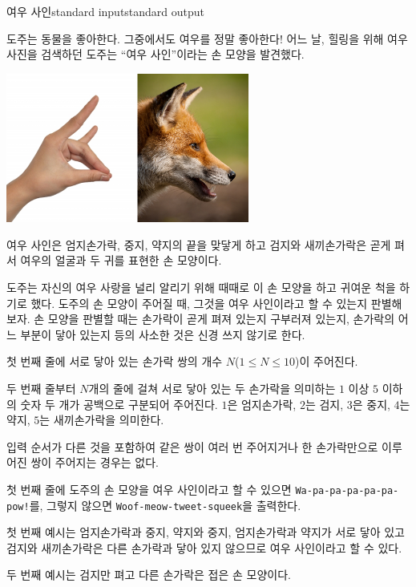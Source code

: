 \begin{problem}{여우 사인}{standard input}{standard output}

도주는 동물을 좋아한다. 그중에서도 여우를 정말 좋아한다! 어느 날, 힐링을 위해 여우 사진을 검색하던 도주는 ``여우 사인''이라는 손 모양을 발견했다.

\begin{center}
  \includegraphics[width=0.6\textwidth]{fox-sign.png}
\end{center}

여우 사인은 엄지손가락, 중지, 약지의 끝을 맞닿게 하고 검지와 새끼손가락은 곧게 펴서 여우의 얼굴과 두 귀를 표현한 손 모양이다.

도주는 자신의 여우 사랑을 널리 알리기 위해 때때로 이 손 모양을 하고 귀여운 척을 하기로 했다. 도주의 손 모양이 주어질 때, 그것을 여우 사인이라고 할 수 있는지 판별해 보자. 손 모양을 판별할 때는 손가락이 곧게 펴져 있는지 구부러져 있는지, 손가락의 어느 부분이 닿아 있는지 등의 사소한 것은 신경 쓰지 않기로 한다.

\InputFile
첫 번째 줄에 서로 닿아 있는 손가락 쌍의 개수 $N$($1 \le N \le 10$)이 주어진다.

두 번째 줄부터 $N$개의 줄에 걸쳐 서로 닿아 있는 두 손가락을 의미하는 $1$ 이상 $5$ 이하의 숫자 두 개가 공백으로 구분되어 주어진다. $1$은 엄지손가락, $2$는 검지, $3$은 중지, $4$는 약지, $5$는 새끼손가락을 의미한다.

입력 순서가 다른 것을 포함하여 같은 쌍이 여러 번 주어지거나 한 손가락만으로 이루어진 쌍이 주어지는 경우는 없다.

\OutputFile
첫 번째 줄에 도주의 손 모양을 여우 사인이라고 할 수 있으면 \texttt{Wa-pa-pa-pa-pa-pa-pow!}를, 그렇지 않으면 \texttt{Woof-meow-tweet-squeek}을 출력한다.

\Example

\begin{example}
%
%
\end{example}

\Notes
첫 번째 예시는 엄지손가락과 중지, 약지와 중지, 엄지손가락과 약지가 서로 닿아 있고 검지와 새끼손가락은 다른 손가락과 닿아 있지 않으므로 여우 사인이라고 할 수 있다.

두 번째 예시는 검지만 펴고 다른 손가락은 접은 손 모양이다.

\end{problem}
